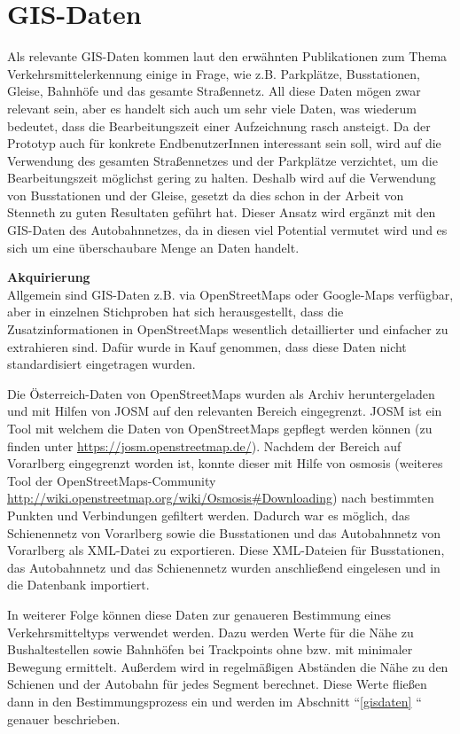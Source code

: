 \section{GIS-Daten}
Als relevante GIS-Daten kommen laut den erwähnten Publikationen zum Thema Verkehrsmittelerkennung einige in Frage, wie z.B. Parkplätze, Busstationen, Gleise, Bahnhöfe und das gesamte Straßennetz. All diese Daten mögen zwar relevant sein, aber es handelt sich auch um sehr viele Daten, was wiederum bedeutet, dass die Bearbeitungszeit einer Aufzeichnung rasch ansteigt. Da der Prototyp auch für konkrete EndbenutzerInnen interessant sein soll, wird auf die Verwendung des gesamten Straßennetzes und der Parkplätze verzichtet, um die Bearbeitungszeit möglichst gering zu halten. Deshalb wird auf die Verwendung von Busstationen und der Gleise, gesetzt da dies schon in der Arbeit von Stenneth \cite{stenneth_transportation_2011} zu guten Resultaten geführt hat. Dieser Ansatz wird ergänzt mit den GIS-Daten des Autobahnnetzes, da in diesen viel Potential vermutet wird und es sich um eine überschaubare Menge an Daten handelt.

\textbf{Akquirierung}\\
Allgemein sind GIS-Daten z.B. via OpenStreetMaps oder Google-Maps verfügbar, aber in einzelnen Stichproben hat sich herausgestellt, dass die Zusatzinformationen in OpenStreetMaps wesentlich detaillierter und einfacher zu extrahieren sind. Dafür wurde in Kauf genommen, dass diese Daten nicht standardisiert eingetragen wurden.

Die Österreich-Daten von OpenStreetMaps wurden als Archiv heruntergeladen und mit Hilfen von JOSM auf den relevanten Bereich eingegrenzt. JOSM ist ein Tool mit welchem die Daten von OpenStreetMaps gepflegt werden können (zu finden unter \url{https://josm.openstreetmap.de/}). Nachdem der Bereich auf Vorarlberg eingegrenzt worden ist, konnte dieser mit Hilfe von osmosis (weiteres Tool der OpenStreetMaps-Community \url{http://wiki.openstreetmap.org/wiki/Osmosis#Downloading}) nach bestimmten Punkten und Verbindungen gefiltert werden. Dadurch war es möglich, das Schienennetz von Vorarlberg sowie die Busstationen und das Autobahnnetz von Vorarlberg als XML-Datei zu exportieren. Diese XML-Dateien für Busstationen, das Autobahnnetz und das Schienennetz wurden anschließend eingelesen und in die Datenbank importiert. 

In weiterer Folge können diese Daten zur genaueren Bestimmung eines Verkehrsmitteltyps verwendet werden. Dazu werden Werte für die Nähe zu Bushaltestellen sowie Bahnhöfen bei Trackpoints ohne bzw. mit minimaler Bewegung ermittelt. Außerdem wird in regelmäßigen Abständen die Nähe zu den Schienen und der Autobahn für jedes Segment berechnet. Diese Werte fließen dann in den Bestimmungsprozess ein und werden im Abschnitt ``\ref{gisdaten} `` genauer beschrieben.

